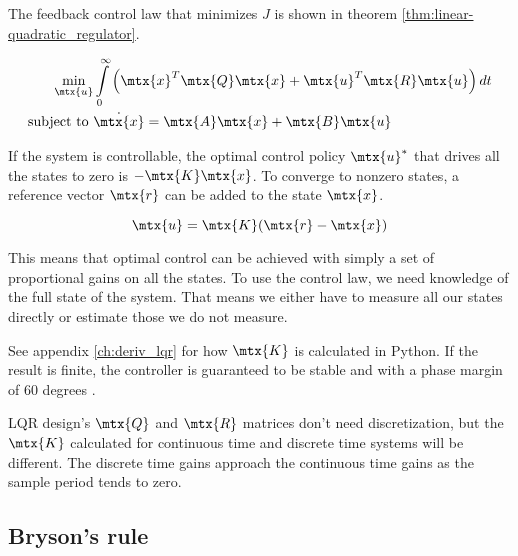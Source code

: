 The feedback \gls{control law} that minimizes $J$ is shown in theorem
\ref{thm:linear-quadratic_regulator}.
\begin{theorem}
  \label{thm:linear-quadratic_regulator}

  \begin{align}
    \min_{\mtx{u}} &\int\limits_0^\infty \left(\mtx{x}^T\mtx{Q}\mtx{x} +
      \mtx{u}^T\mtx{R}\mtx{u}\right) dt \nonumber \\
    \text{subject to } &\dot{\mtx{x}} = \mtx{A}\mtx{x} + \mtx{B}\mtx{u}
  \end{align}

  If the \gls{system} is controllable, the optimal control policy $\mtx{u}^*$
  that drives all the \glspl{state} to zero is $-\mtx{K}\mtx{x}$. To converge to
  nonzero \glspl{state}, a \gls{reference} vector $\mtx{r}$ can be added to the
  \gls{state} $\mtx{x}$.

  \begin{equation}
    \mtx{u} = \mtx{K}(\mtx{r} - \mtx{x})
  \end{equation}
\end{theorem}

This means that optimal control can be achieved with simply a set of
proportional gains on all the \glspl{state}. To use the \gls{control law}, we
need knowledge of the full \gls{state} of the \gls{system}. That means we either
have to measure all our \glspl{state} directly or estimate those we do not
measure.

See appendix \ref{ch:deriv_lqr} for how $\mtx{K}$ is calculated in Python. If
the result is finite, the controller is guaranteed to be stable and
 with a \gls{phase margin} of 60 degrees
\cite{bib:lqr_phase_margin}.
\begin{remark}
  LQR design's $\mtx{Q}$ and $\mtx{R}$ matrices don't need \gls{discretization},
  but the $\mtx{K}$ calculated for continuous time and discrete time
  \glspl{system} will be different. The discrete time gains approach the
  continuous time gains as the sample period tends to zero.
\end{remark}

\subsection{Bryson's rule}

